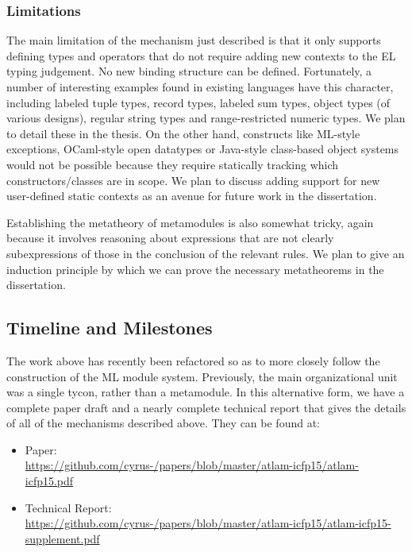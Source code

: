  

\subsubsection{Limitations}
The main limitation of the mechanism just described is that it only supports defining types and operators that do not require adding new contexts to the EL typing judgement. No new binding structure can be defined. Fortunately, a number of interesting examples found in existing languages have this character, including labeled tuple types, record types, labeled sum types, object types (of various designs), regular string types and range-restricted numeric types. We plan to detail these in the thesis. On the other hand, constructs like ML-style exceptions, OCaml-style open datatypes or Java-style class-based object systems would not be possible because they require statically tracking which constructors/classes are in scope. We plan to discuss adding support for new user-defined static contexts as an avenue for future work in the dissertation.

Establishing the metatheory of metamodules is also somewhat tricky, again because it involves reasoning about expressions that are not clearly subexpressions of those in the conclusion of the relevant rules. We plan to give an induction principle by which we can prove the necessary metatheorems in the dissertation.


\subsection{Timeline and Milestones}\label{sec:metamodules-timeline}
The work above has recently been refactored so as to more closely follow the construction of the ML module system. Previously, the main organizational unit was a single tycon, rather than a metamodule. In this alternative form, we have a complete paper draft and a nearly complete technical report that gives the details of all of the mechanisms described above. They can be found at:
\begin{itemize}
\item Paper:\\ \url{https://github.com/cyrus-/papers/blob/master/atlam-icfp15/atlam-icfp15.pdf}
\item Technical Report:\\ \url{https://github.com/cyrus-/papers/blob/master/atlam-icfp15/atlam-icfp15-supplement.pdf}
\end{itemize}

